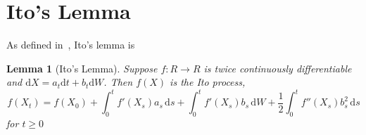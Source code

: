 \documentclass[11pt]{article} %
\newtheorem{lemma}[theorem]{Lemma}
\begin{document}
\section{Ito's Lemma}
As defined in~\cite{itoprocess}, Ito's lemma is 

\begin{lemma}[Ito's Lemma]\label{itolemma}
    Suppose $f: R \to R$ is twice continuously differentiable and 
    $\mathrm{d}X = a_t\mathrm{d}t + b_t\mathrm{d}W$. Then $f(X)$ is the Ito process,
    \begin{equation}
        f(X_t)
        = f(X_0) + \int_0^t \! f'(X_s)a_s \, \mathrm{d}s + 
        \int_0^t \! f'(X_s)b_s \, \mathrm{d}W + \frac{1}{2}\int_0^t \! f''(X_s)b_s^2 \,
         \mathrm{d}s
    \end{equation}
    for $t\ge0$
\end{lemma}
\end{document}
